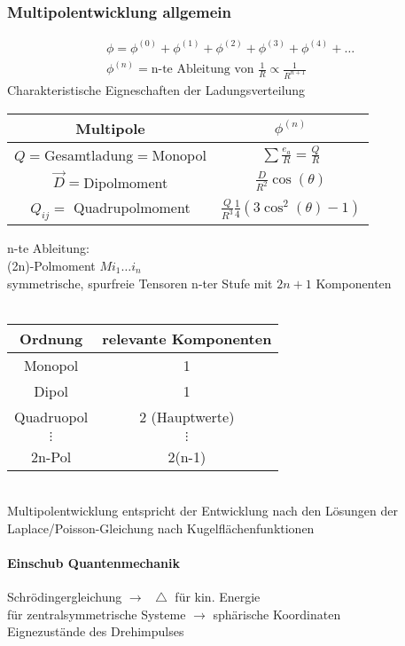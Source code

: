 \documentclass[a4paper]{article}
\newcommand*\laplace{\mathop{}\!\mathbin\bigtriangleup}
\begin{document}
\subsubsection{Multipolentwicklung allgemein}
\begin{align}
\phi=\phi^{(0)}+\phi^{(1)}+\phi^{(2)}+\phi^{(3)}+\phi^{(4)}+\ldots\\
\phi^{(n)}=\text{n-te Ableitung von }\frac{1}{R}\propto \frac{1}{R^{n+1}}
\end{align}
Charakteristische Eigneschaften der Ladungsverteilung\\
\begin{tabular}{c|c}
Multipole & $\phi^{(n)}$\\
\hline
$Q=$Gesamtladung$=$Monopol & $\sum \frac{e_a}{R}=\frac{Q}{R}$\\
$\vec{D}=$Dipolmoment &$\frac{D}{R^2}\cos(\theta)$\\
$Q_{ij}=$ Quadrupolmoment & $\frac{Q}{R^3}\frac{1}{4}\left(3
\cos^2(\theta)-1\right)$\\
\end{tabular}
n-te Ableitung:\\ 
(2n)-Polmoment $M{i_1\ldots i_n}$\\
symmetrische, spurfreie Tensoren n-ter Stufe mit $2n+1$  Komponenten\\\\
\begin{tabular}{c|c}
Ordnung & relevante Komponenten\\
\hline
Monopol & 1\\
Dipol & 1\\
Quadruopol & 2 (Hauptwerte)\\
$\vdots$&$\vdots$\\
2n-Pol & 2(n-1)
\end{tabular}\\

Multipolentwicklung entspricht der Entwicklung nach den Lösungen der
Laplace/Poisson-Gleichung nach Kugelflächenfunktionen
\paragraph{Einschub Quantenmechanik}
Schrödingergleichung
$\rightarrow \laplace$ für kin. Energie\\
für zentralsymmetrische Systeme $\rightarrow$ sphärische Koordinaten\\
Eignezustände des Drehimpulses
\end{document}
